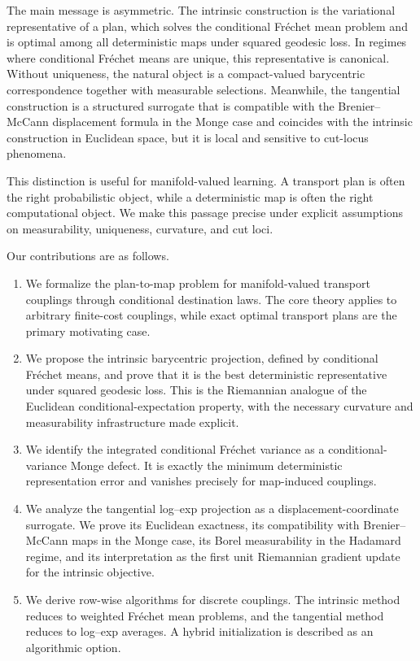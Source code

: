 \documentclass[10pt]{article} %
\theoremstyle{definition}
\providecommand{\1}{\mathbf{1}}
\providecommand{\Frechet}{Fr\'{e}chet\xspace}
\begin{document}
The main message is asymmetric. The intrinsic construction is the variational representative of a plan, which solves the conditional \Frechet mean problem and is optimal among all deterministic maps under squared geodesic loss. In regimes where conditional \Frechet means are unique, this representative is canonical. Without uniqueness, the natural object is a compact-valued barycentric correspondence together with measurable selections. Meanwhile, the  tangential construction is a structured surrogate that is compatible with the Brenier--McCann displacement formula in the Monge case and coincides with the intrinsic construction in Euclidean space, but it is local and sensitive to cut-locus phenomena.

This distinction is useful for manifold-valued learning. A transport plan is
often the right probabilistic object, while a deterministic map is often the
right computational object. We make this passage precise under explicit
assumptions on measurability, uniqueness, curvature, and cut loci.

Our contributions are as follows.
\begin{enumerate}
    \item We formalize the plan-to-map problem for manifold-valued transport couplings through conditional destination laws. The core theory applies to arbitrary finite-cost couplings, while exact optimal transport plans are the primary motivating case.
    \item We propose the intrinsic barycentric projection, defined by conditional Fr\'echet means, and prove that it is the best deterministic representative under squared geodesic loss. This is the Riemannian analogue of the Euclidean conditional-expectation property, with the necessary curvature and measurability infrastructure made explicit.
    \item We identify the integrated conditional Fr\'echet variance as a conditional-variance Monge defect. It is exactly the minimum deterministic representation error and vanishes precisely for map-induced couplings.
    \item We analyze the tangential log--exp projection as a displacement-coordinate surrogate. We prove its Euclidean exactness, its compatibility with Brenier--McCann maps in the Monge case, its Borel measurability in the Hadamard regime, and its interpretation as the first unit Riemannian gradient update for the intrinsic objective.
    \item We derive row-wise algorithms for discrete couplings. The intrinsic method reduces to weighted Fr\'echet mean problems, and the tangential method reduces to log--exp averages. A hybrid initialization is described as an algorithmic option. 
\end{enumerate}
\end{document}
